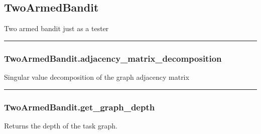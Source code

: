 \hypertarget{twoarmedbandit}{%
\subsection{TwoArmedBandit}\label{twoarmedbandit}}

\begin{Shaded}
\begin{Highlighting}[]
\end{Highlighting}
\end{Shaded}

Two armed bandit just as a tester

\begin{center}\rule{0.5\linewidth}{\linethickness}\end{center}

\hypertarget{twoarmedbandit.adjacency_matrix_decomposition}{%
\subsubsection{TwoArmedBandit.adjacency\_matrix\_decomposition}\label{twoarmedbandit.adjacency_matrix_decomposition}}

\begin{Shaded}
\begin{Highlighting}[]
\NormalTok{)}
\end{Highlighting}
\end{Shaded}

Singular value decomposition of the graph adjacency matrix

\begin{center}\rule{0.5\linewidth}{\linethickness}\end{center}

\hypertarget{twoarmedbandit.get_graph_depth}{%
\subsubsection{TwoArmedBandit.get\_graph\_depth}\label{twoarmedbandit.get_graph_depth}}

\begin{Shaded}
\begin{Highlighting}[]
\NormalTok{)}
\end{Highlighting}
\end{Shaded}

Returns the depth of the task graph.

